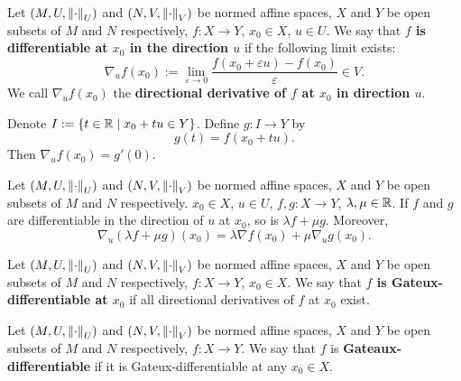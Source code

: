 \begin{definition}
  Let
    $(M, U, \left\lVert\cdot\right\rVert_U)$ and $(N, V, \left\lVert\cdot\right\rVert_V)$
      be normed affine spaces,
    $X$ and $Y$ be open subsets of $M$ and $N$ respectively,
    $f \colon X \to Y$,
    $x_0 \in X$,
    $u \in U$.
  We say that \textbf{$f$ is differentiable at $x_0$ in the direction $u$}
  if the following limit exists:
  \begin{equation}
    \nabla_u f(x_0)
    := \lim_{\varepsilon \to 0}
      \frac{f(x_0 + \varepsilon u) - f(x_0)}{\varepsilon} \in V.
  \end{equation}
  We call $\nabla_u f(x_0)$ the
  \textbf{directional derivative of $f$ at $x_0$ in direction $u$}.
\end{definition}
\begin{remark}
  Denote $I := \left\{ t \in \mathbb{R} \mid x_0 + t u \in Y \right\}$. 
  Define $g \colon I \to Y$ by
  \begin{equation}
    g(t) = f(x_0 + t u).
  \end{equation}
  Then $\nabla_u f(x_0) = g'(0)$.
\end{remark}
\begin{proposition}
  Let
    $(M, U, \left\lVert\cdot\right\rVert_U)$ and $(N, V, \left\lVert\cdot\right\rVert_V)$
      be normed affine spaces,
    $X$ and $Y$ be open subsets of $M$ and $N$ respectively.
    $x_0 \in X$,
    $u \in U$,
    $f, g \colon X \to Y$,
    $\lambda, \mu \in \mathbb{R}$.
  If $f$ and $g$ are differentiable in the direction of $u$ at $x_0$, so is
  $\lambda f + \mu g$.
  Moreover,
  \begin{equation}
    \nabla_u (\lambda f + \mu g)(x_0)
    = \lambda \nabla f(x_0) + \mu \nabla_u g(x_0).
  \end{equation}
\end{proposition}
\begin{definition}
  Let
    $(M, U, \left\lVert\cdot\right\rVert_U)$ and $(N, V, \left\lVert\cdot\right\rVert_V)$
      be normed affine spaces,
    $X$ and $Y$ be open subsets of $M$ and $N$ respectively,
    $f \colon X \to Y$,
    $x_0 \in X$.
  We say that \textbf{$f$ is Gateux-differentiable at $x_0$} if all directional
  derivatives of $f$ at $x_0$ exist.
\end{definition}
\begin{definition}
  Let
    $(M, U, \left\lVert\cdot\right\rVert_U)$ and $(N, V, \left\lVert\cdot\right\rVert_V)$
      be normed affine spaces,
    $X$ and $Y$ be open subsets of $M$ and $N$ respectively,
    $f \colon X \to Y$.
  We say that $f$ is \textbf{Gateaux-differentiable}
  if it is Gateux-differentiable at any $x_0 \in X$.
\end{definition}
